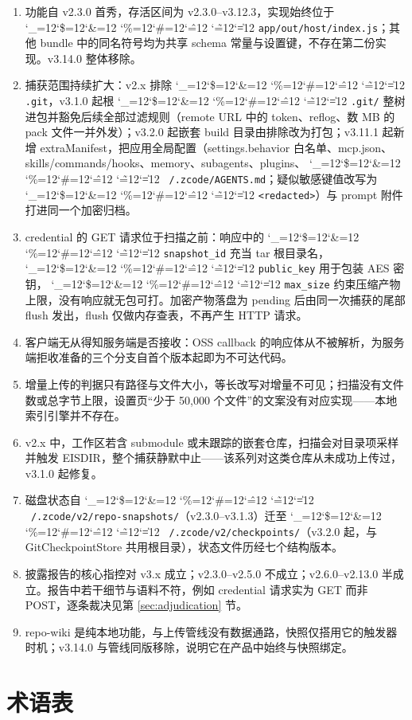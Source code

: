 \documentclass[11pt,a4paper,fontset=none]{ctexart}
\newcommand{\cid}{%
  \begingroup
  \catcode`\_=12\relax \catcode`\$=12\relax \catcode`\&=12\relax
  \catcode`\%=12\relax \catcode`\#=12\relax \catcode`\^=12\relax
  \catcode`\~=12\relax \catcode`\|=12\relax
  \codeSpan}
\newcommand{\codeSpan}[1]{{\small\texttt{#1}}\endgroup}
\begin{document}
\begin{enumerate}
\item 功能自 v2.3.0 首秀，存活区间为 v2.3.0–v3.12.3，实现始终位于 \cid{app/out/host/index.js}；其他 bundle 中的同名符号均为共享 schema 常量与设置键，不存在第二份实现。v3.14.0 整体移除。
\item 捕获范围持续扩大：v2.x 排除 \cid{.git}，v3.1.0 起根 \cid{.git/} 整树进包并豁免后续全部过滤规则（remote URL 中的 token、reflog、数 MB 的 pack 文件一并外发）；v3.2.0 起嵌套 build 目录由排除改为打包；v3.11.1 起新增 extraManifest，把应用全局配置（settings.behavior 白名单、mcp.json、skills/commands/hooks、memory、subagents、plugins、\cid{~/.zcode/AGENTS.md}；疑似敏感键值改写为 \cid{<redacted>}）与 prompt 附件打进同一个加密归档。
\item credential 的 GET 请求位于扫描之前：响应中的 \cid{snapshot_id} 充当 tar 根目录名，\cid{public_key} 用于包装 AES 密钥，\cid{max_size} 约束压缩产物上限，没有响应就无包可打。加密产物落盘为 pending 后由同一次捕获的尾部 flush 发出，flush 仅做内存查表，不再产生 HTTP 请求。
\item 客户端无从得知服务端是否接收：OSS callback 的响应体从不被解析，为服务端拒收准备的三个分支自首个版本起即为不可达代码。
\item 增量上传的判据只有路径与文件大小，等长改写对增量不可见；扫描没有文件数或总字节上限，设置页“少于 50,000 个文件”的文案没有对应实现——本地索引引擎并不存在。
\item v2.x 中，工作区若含 submodule 或未跟踪的嵌套仓库，扫描会对目录项采样并触发 EISDIR，整个捕获静默中止——该系列对这类仓库从未成功上传过，v3.1.0 起修复。
\item 磁盘状态自 \cid{~/.zcode/v2/repo-snapshots/}（v2.3.0–v3.1.3）迁至 \cid{~/.zcode/v2/checkpoints/}（v3.2.0 起，与 GitCheckpointStore 共用根目录），状态文件历经七个结构版本。
\item 披露报告的核心指控对 v3.x 成立；v2.3.0–v2.5.0 不成立；v2.6.0–v2.13.0 半成立。报告中若干细节与语料不符，例如 credential 请求实为 GET 而非 POST，逐条裁决见第 \ref{sec:adjudication} 节。
\item repo-wiki 是纯本地功能，与上传管线没有数据通路，快照仅搭用它的触发器时机；v3.14.0 与管线同版移除，说明它在产品中始终与快照绑定。
\end{enumerate}

\section{术语表}
\end{document}
